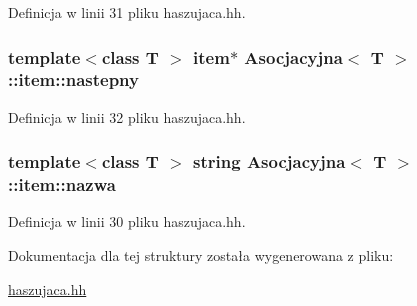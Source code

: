 \-Definicja w linii 31 pliku haszujaca.\-hh.

\hypertarget{struct_asocjacyjna_1_1item_a7031da0f74b513b793b4abb93af7d3c3}{
\subsubsection[{nastepny}]{\setlength{\rightskip}{0pt plus 5cm}template$<$class T $>$ {\bf item}$\ast$ {\bf \-Asocjacyjna}$<$ \-T $>$\-::{\bf item\-::nastepny}}}\label{struct_asocjacyjna_1_1item_a7031da0f74b513b793b4abb93af7d3c3}


\-Definicja w linii 32 pliku haszujaca.\-hh.

\hypertarget{struct_asocjacyjna_1_1item_a08f14a8db9bfd74ac9666879ce502835}{
\subsubsection[{nazwa}]{\setlength{\rightskip}{0pt plus 5cm}template$<$class T $>$ string {\bf \-Asocjacyjna}$<$ \-T $>$\-::{\bf item\-::nazwa}}}\label{struct_asocjacyjna_1_1item_a08f14a8db9bfd74ac9666879ce502835}


\-Definicja w linii 30 pliku haszujaca.\-hh.



\-Dokumentacja dla tej struktury została wygenerowana z pliku\-:\begin{DoxyCompactItemize}
\item 
\hyperlink{haszujaca_8hh}{haszujaca.\-hh}\end{DoxyCompactItemize}
